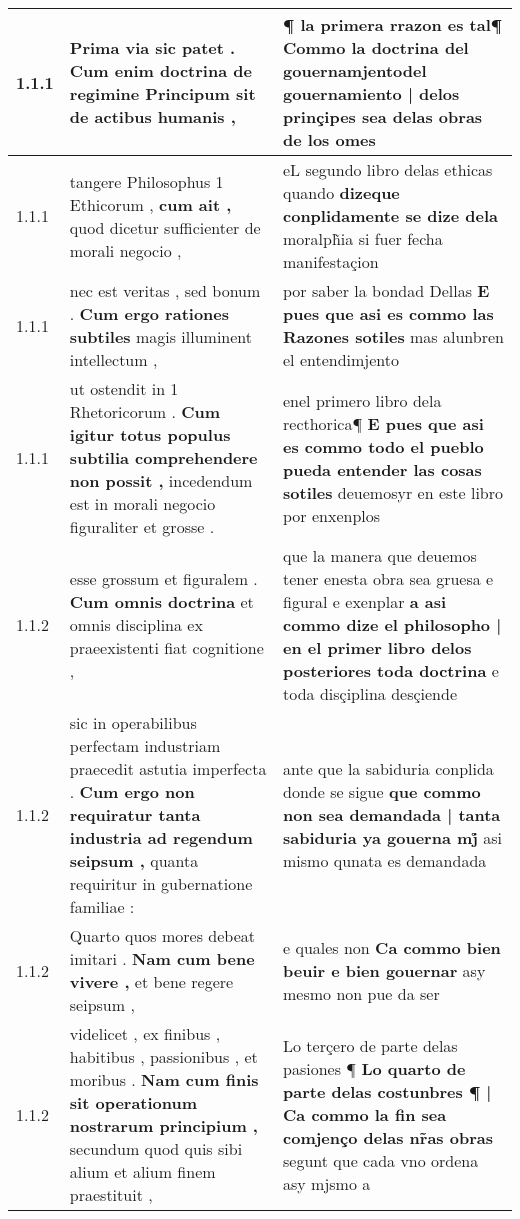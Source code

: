 \begin{tabular}{|p{1cm}|p{6.5cm}|p{6.5cm}|}

\hline
1.1.1 & Prima via sic patet . \textbf{ Cum enim doctrina de regimine Principum } sit de actibus humanis , & ¶ la primera rrazon es tal¶ Commo la doctrina del \textbf{ gouernamjentodel gouernamiento | delos prinçipes } sea delas obras de los omes \\\hline
1.1.1 & tangere Philosophus 1 Ethicorum , \textbf{ cum ait , } quod dicetur sufficienter de morali negocio , & eL segundo libro delas ethicas quando \textbf{ dizeque conplidamente se dize dela } moralph̃ia si fuer fecha manifestaçion \\\hline
1.1.1 & nec est veritas , sed bonum . \textbf{ Cum ergo rationes subtiles } magis illuminent intellectum , & por saber la bondad Dellas \textbf{ E pues que asi es commo las Razones sotiles } mas alunbren el entendimjento \\\hline
1.1.1 & ut ostendit in 1 Rhetoricorum . \textbf{ Cum igitur totus populus subtilia comprehendere non possit , } incedendum est in morali negocio figuraliter et grosse . & enel primero libro dela recthorica¶ \textbf{ E pues que asi es commo todo el pueblo pueda entender las cosas sotiles } deuemosyr en este libro por enxenplos \\\hline
1.1.2 & esse grossum et figuralem . \textbf{ Cum omnis doctrina } et omnis disciplina ex praeexistenti fiat cognitione , & que la manera que deuemos tener enesta obra sea gruesa e figural e exenplar \textbf{ a asi commo dize el philosopho | en el primer libro delos posteriores toda doctrina } e toda disçiplina desçiende \\\hline
1.1.2 & sic in operabilibus perfectam industriam praecedit astutia imperfecta . \textbf{ Cum ergo non requiratur tanta industria ad regendum seipsum , } quanta requiritur in gubernatione familiae : & ante que la sabiduria conplida donde se sigue \textbf{ que commo non sea demandada | tanta sabiduria ya gouerna mj̊ } asi mismo qunata es demandada \\\hline
1.1.2 & Quarto quos mores debeat imitari . \textbf{ Nam cum bene vivere , } et bene regere seipsum , & e quales non \textbf{ Ca commo bien beuir e bien gouernar } asy mesmo non pue da ser \\\hline
1.1.2 & videlicet , ex finibus , habitibus , passionibus , et moribus . \textbf{ Nam cum finis sit operationum nostrarum principium , } secundum quod quis sibi alium et alium finem praestituit , & Lo terçero de parte delas pasiones ¶ \textbf{ Lo quarto de parte delas costunbres ¶ | Ca commo la fin sea comjenço delas nr̃as obras } segunt que cada vno ordena asy mjsmo a \\\hline

\end{tabular}
